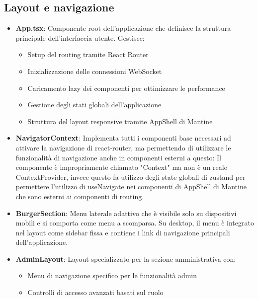 \documentclass[11pt]{article}
\begin{document}
\subsection{Layout e navigazione}
\begin{itemize}
    \item \textbf{App.tsx}: Componente root dell'applicazione che definisce la struttura principale dell'interfaccia utente. Gestisce:
    \begin{itemize}
        \item Setup del routing tramite React Router
        \item Inizializzazione delle connessioni WebSocket
        \item Caricamento lazy dei componenti per ottimizzare le performance
        \item Gestione degli stati globali dell'applicazione
        \item Struttura del layout responsive tramite AppShell di Mantine
    \end{itemize}

    \item \textbf{NavigatorContext}: Implementa tutti i componenti base necessari ad attivare la navigazione di react-router, ma permettendo di utilizzare le funzionalità di navigazione anche in componenti esterni a questo: Il componente è impropriamente chiamato "Context" ma non è un reale ContextProvider, invece questo fa utilizzo degli state globali di zustand per permettere l'utilizzo di useNavigate nei componenti di AppShell di Mantine che sono esterni ai componenti di routing.

    \item \textbf{BurgerSection}: Menu laterale adattivo che è visibile solo su dispositivi mobili e si comporta come menu a scomparsa. Su desktop, il menu è integrato nel layout come sidebar fissa e contiene i link di navigazione principali dell'applicazione.

    \item \textbf{AdminLayout}: Layout specializzato per la sezione amministrativa con:
    \begin{itemize}
        \item Menu di navigazione specifico per le funzionalità admin
        \item Controlli di accesso avanzati basati sul ruolo
    \end{itemize}
\end{itemize}
\end{document}
